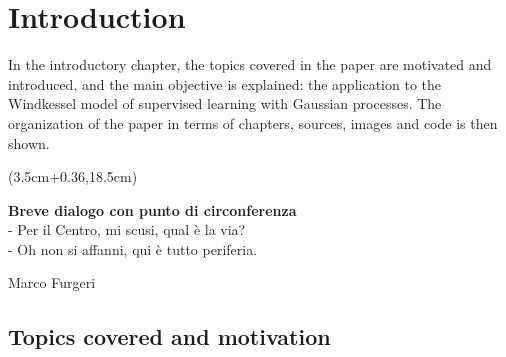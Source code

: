 \chapter{Introduction}
In the introductory chapter, the topics covered in the paper are motivated and introduced, and the main objective is explained: the application to the Windkessel model of supervised learning with Gaussian processes. The organization of the paper in terms of chapters, sources, images and code is then shown.

\begin{textblock*}{0.64\textwidth}(3.5cm+0.36\textwidth,18.5cm)
\epigraph{\textbf{Breve dialogo con punto di circonferenza}\\
- Per il Centro, mi scusi, qual è la via?\\
- Oh non si affanni, qui è tutto periferia.}{Marco Furgeri}
\end{textblock*}

\newpage




\section{Topics covered and motivation}
